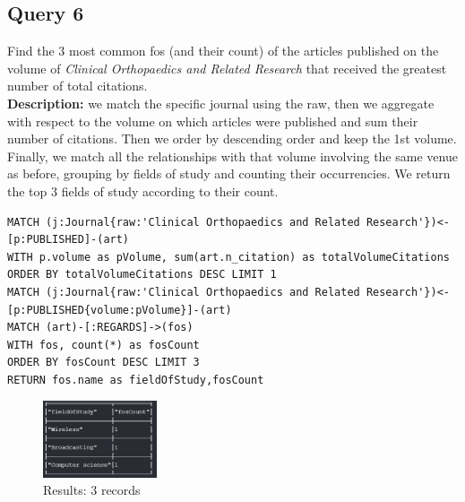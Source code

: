 \documentclass{Configuration_Files/PoliMi3i_thesis}
\begin{document}
\subsection{Query 6}
Find the 3 most common fos (and their count) of the articles published on the volume of \emph{Clinical Orthopaedics and Related Research}
that received the greatest number of total citations.\\
\textbf{Description:} we match the specific journal using the raw, then we aggregate with respect to the volume on which
articles were published and sum their number of citations. Then we order by descending order and keep the 1st volume. Finally,
we match all the relationships with that volume involving the same venue as before, grouping by fields of study and counting
their occurrencies. We return the top 3 fields of study according to their count.
\begin{lstlisting}[language=cypher, label=lst:cypher-example]
MATCH (j:Journal{raw:'Clinical Orthopaedics and Related Research'})<-[p:PUBLISHED]-(art)
WITH p.volume as pVolume, sum(art.n_citation) as totalVolumeCitations
ORDER BY totalVolumeCitations DESC LIMIT 1
MATCH (j:Journal{raw:'Clinical Orthopaedics and Related Research'})<-[p:PUBLISHED{volume:pVolume}]-(art)
MATCH (art)-[:REGARDS]->(fos)
WITH fos, count(*) as fosCount
ORDER BY fosCount DESC LIMIT 3
RETURN fos.name as fieldOfStudy,fosCount
\end{lstlisting}
\begin{figure}[H]
\centering
\includegraphics[width=0.3\textwidth]{query/query6.PNG}
\caption{Results: 3 records}
\label{fig:query6}
\end{figure}
\end{document}

